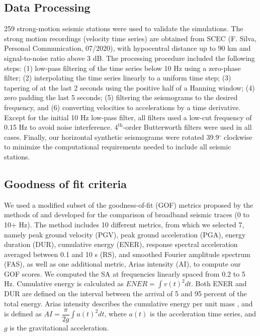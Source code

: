 \subsection{Data Processing}
259 strong-motion seismic stations were used to validate the simulations. The strong motion recordings (velocity time series) are obtained from SCEC (F. Silva, Personal Communication, 07/2020), with hypocentral distance up to 90 km and signal-to-noise ratio above 3 dB. The processing procedure included the following steps: (1) low-pass filtering of the time series below 10 Hz using a zero-phase filter; (2) interpolating the time series linearly to a uniform time step; (3) tapering of at the last 2 seconds using the positive half of a Hanning window; (4) zero padding the last 5 seconds; (5) filtering the seismograms to the desired frequency, and (6) converting velocities to accelerations by a time derivative. Except for the initial 10 Hz low-pass filter, all filters used a low-cut frequency of 0.15 Hz to avoid noise interference. $4^{\text{th}}$-order Butterworth filters were used in all cases. Finally, our horizontal synthetic seismograms were rotated 39.9$^\circ$ clockwise to minimize the computational requirements needed to include all seismic stations.

\subsection{Goodness of fit criteria}
We used a modified subset of the goodness-of-fit (GOF) metrics proposed by the methods of \citet{andersonQuantitativeMeasureGoodnessOfFit2004} and \citet{olsenGoodnessoffitCriteriaBroadband2010} developed for the comparison of broadband seismic traces (0 to 10+ Hz). The method includes 10 different metrics, from which we selected 7, namely peak ground velocity (PGV), peak ground acceleration (PGA), energy duration (DUR), cumulative energy (ENER), response spectral acceleration averaged between 0.1 and 10 s (RS), and smoothed Fourier amplitude spectrum (FAS), as well as one additional metric, Arias intensity (AI), to compute our GOF scores. We computed the SA at frequencies linearly spaced from 0.2 to 5 Hz. Cumulative energy is calculated as $E N E R=\int v(t)^{2} d t$. Both ENER and DUR are defined on the interval between the arrival of 5 and 95 percent of the total energy. Arias intensity describes the cumulative energy per unit mass \citep{arias1970measure}, and is defined as $AI=\dfrac{\pi}{2 g} \int a(t)^{2} d t$, where $a(t)$ is the acceleration time series, and $g$ is the gravitational acceleration.

